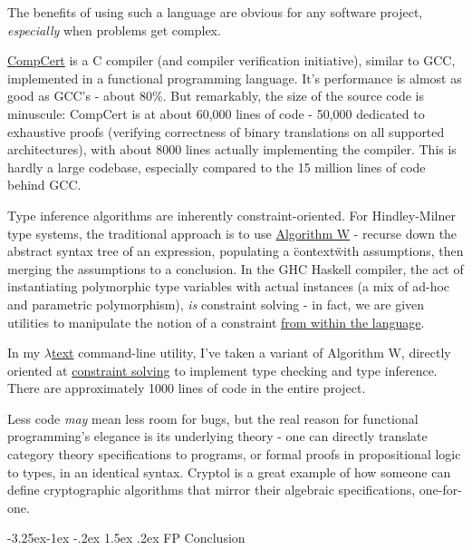 \documentclass[11pt,pressrelease]{newlfm} %
\makeatletter
\newcounter{section}
\newcounter{subsection}[section]
\newcommand\subsection{\@startsection{subsection}{2}{\z@}%
                                     {-3.25ex\@plus -1ex \@minus -.2ex}%
                                     {1.5ex \@plus .2ex}%
                                     {\normalfont\large\bfseries}}
\makeatother
\begin{document}
\begin{newlfm}
\begin{singlespace}
The benefits of using such a language are obvious for any software project, \textit{especially}
when problems get complex.

\href{http://compcert.inria.fr/}{CompCert} is a C compiler (and compiler verification initiative),
similar to GCC, implemented in a functional programming language.
It's performance is almost as good as GCC's - about 80\%.
But remarkably, the size of the source code is minuscule:
CompCert is at about 60,000 lines of code - 50,000 dedicated to exhaustive proofs (verifying
correctness of binary translations on all supported architectures), with about 8000 lines
actually implementing the compiler. This is hardly a large codebase, especially compared
to the 15 million lines of code behind GCC.

Type inference algorithms are inherently constraint-oriented. For Hindley-Milner type systems,
the traditional approach is to use
\href{http://citeseerx.ist.psu.edu/viewdoc/download?doi=10.1.1.65.7733&rep=rep1&type=pdf}{Algorithm W} -
recurse down the abstract syntax tree of an expression, populating a \"context\" with assumptions,
then merging the assumptions to a conclusion. In the GHC Haskell compiler, the act of instantiating
polymorphic type variables with actual instances (a mix of ad-hoc and parametric polymorphism),
\textit{is} constraint solving - in fact, we are given utilities to manipulate the notion of a
constraint
\href{http://hackage.haskell.org/package/constraints}{from within the language}.

In my \href{http://ltext.github.io}{\(\lambda\)text}
command-line utility, I've taken a variant of Algorithm W, directly oriented at
\href{http://citeseerx.ist.psu.edu/viewdoc/summary?doi=10.1.1.18.9348}{constraint solving} to
implement type checking and type inference. There are approximately 1000 lines of
code in the entire project.

Less code \textit{may} mean less room for bugs, but the real reason for functional programming's
elegance is its underlying theory - one can directly translate category theory specifications to programs, or
formal proofs in propositional logic to types, in an identical syntax. Cryptol is a great
example of how someone can define cryptographic algorithms that mirror their algebraic specifications,
one-for-one.

\subsection{FP Conclusion}


\end{singlespace}
\end{newlfm}
\end{document}
